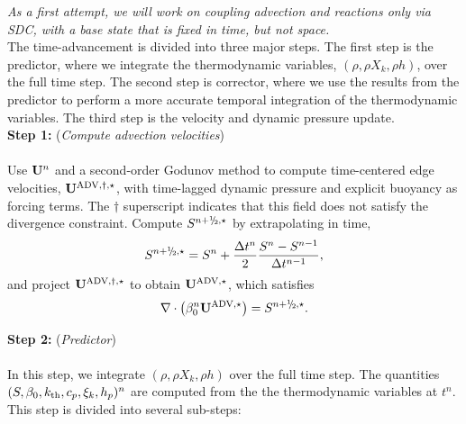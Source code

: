 \documentclass{aastex63}
\newcommand{\sfrac}[2]{\mathchoice
  {\kern0em\raise.5ex\hbox{\the\scriptfont0 #1}\kern-.15em/
   \kern-.15em\lower.25ex\hbox{\the\scriptfont0 #2}}
  {\kern0em\raise.5ex\hbox{\the\scriptfont0 #1}\kern-.15em/
   \kern-.15em\lower.25ex\hbox{\the\scriptfont0 #2}}
  {\kern0em\raise.5ex\hbox{\the\scriptscriptfont0 #1}\kern-.2em/
   \kern-.15em\lower.25ex\hbox{\the\scriptscriptfont0 #2}}
  {#1\!/#2}}
\newcommand{\myhalf}{\sfrac{1}{2}}
\newcommand{\Ub}{{\bf{U}}}
\newcommand{\uadvone}{\Ub^{\mathrm{ADV},\star}}
\newcommand{\uadvonedag}{\Ub^{\mathrm{ADV},\dagger,\star}}
\begin{document}
\emph{As a first attempt, we will work on coupling advection and reactions only
via SDC, with a base state that is fixed in time, but not space.}
\\

The time-advancement is divided into three major steps.  The first step is the predictor, where we integrate the thermodynamic variables, $(\rho,\rho X_k,\rho h)$, over the full time step.  The second step is corrector, where we use the results from the predictor to perform a more accurate temporal integration of the thermodynamic variables.  The third step is the velocity and dynamic pressure update.\\

{\bf Step 1:} ({\it Compute advection velocities})\\ \\
Use $\Ub^n$ and a second-order Godunov method to compute time-centered edge velocities, $\uadvonedag$, with time-lagged dynamic pressure and explicit buoyancy as forcing terms.  The $\dagger$ superscript indicates that this field does not satisfy the divergence constraint.  Compute $S^{n+\myhalf,\star}$ by extrapolating in time,
\begin{equation}
S^{n+\myhalf,\star} = S^n + \frac{\Delta t^n}{2}\frac{S^n - S^{n-1}}{\Delta t^{n-1}},
\end{equation}
and project $\uadvonedag$ to obtain $\uadvone$, which satisfies
\begin{equation}
\nabla\cdot\left(\beta_0^n\uadvone\right) = S^{n+\myhalf,\star}.
\end{equation}

{\bf Step 2:} ({\it Predictor})\\ \\
 In this step, we integrate $(\rho, \rho X_k, \rho h)$ over the full time step.  The quantities $(S, \beta_0, k_{\rm th}, c_p, \xi_k, h_p)^n$ are computed from the the thermodynamic variables at $t^n$.  This step is divided into several sub-steps:\\
\end{document}
